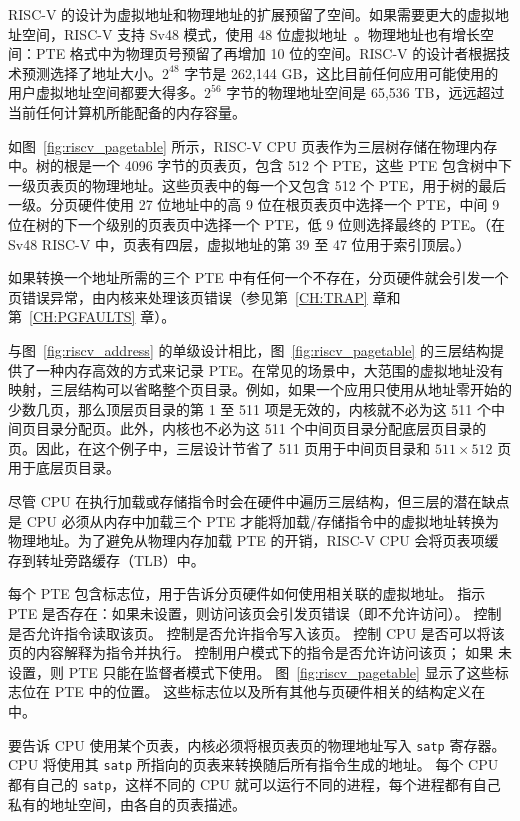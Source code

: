 RISC-V 的设计为虚拟地址和物理地址的扩展预留了空间。如果需要更大的虚拟地址空间，RISC-V 支持 Sv48 模式，使用 48 位虚拟地址~\cite{riscv:priv}。物理地址也有增长空间：PTE 格式中为物理页号预留了再增加 10 位的空间。RISC-V 的设计者根据技术预测选择了地址大小。$2^{48}$ 字节是 262,144 GB，这比目前任何应用可能使用的用户虚拟地址空间都要大得多。$2^{56}$ 字节的物理地址空间是 65,536 TB，远远超过当前任何计算机所能配备的内存容量。

如图~\ref{fig:riscv_pagetable} 所示，RISC-V CPU 页表作为三层树存储在物理内存中。树的根是一个 4096 字节的页表页，包含 512 个 PTE，这些 PTE 包含树中下一级页表页的物理地址。这些页表中的每一个又包含 512 个 PTE，用于树的最后一级。分页硬件使用 27 位地址中的高 9 位在根页表页中选择一个 PTE，中间 9 位在树的下一个级别的页表页中选择一个 PTE，低 9 位则选择最终的 PTE。（在 Sv48 RISC-V 中，页表有四层，虚拟地址的第 39 至 47 位用于索引顶层。）

如果转换一个地址所需的三个 PTE 中有任何一个不存在，分页硬件就会引发一个页错误异常，由内核来处理该页错误（参见第~\ref{CH:TRAP} 章和第~\ref{CH:PGFAULTS} 章）。

与图~\ref{fig:riscv_address} 的单级设计相比，图~\ref{fig:riscv_pagetable} 的三层结构提供了一种内存高效的方式来记录 PTE。在常见的场景中，大范围的虚拟地址没有映射，三层结构可以省略整个页目录。例如，如果一个应用只使用从地址零开始的少数几页，那么顶层页目录的第 1 至 511 项是无效的，内核就不必为这 511 个中间页目录分配页。此外，内核也不必为这 511 个中间页目录分配底层页目录的页。因此，在这个例子中，三层设计节省了 511 页用于中间页目录和 $511\times512$ 页用于底层页目录。

尽管 CPU 在执行加载或存储指令时会在硬件中遍历三层结构，但三层的潜在缺点是 CPU 必须从内存中加载三个 PTE 才能将加载/存储指令中的虚拟地址转换为物理地址。为了避免从物理内存加载 PTE 的开销，RISC-V CPU 会将页表项缓存到转址旁路缓存（TLB）中。

每个 PTE 包含标志位，用于告诉分页硬件如何使用相关联的虚拟地址。
指示 PTE 是否存在：如果未设置，则访问该页会引发页错误（即不允许访问）。
控制是否允许指令读取该页。
控制是否允许指令写入该页。
控制 CPU 是否可以将该页的内容解释为指令并执行。
控制用户模式下的指令是否允许访问该页；
如果  未设置，则 PTE 只能在监督者模式下使用。
图~\ref{fig:riscv_pagetable} 显示了这些标志位在 PTE 中的位置。
这些标志位以及所有其他与页硬件相关的结构定义在
 中。

要告诉 CPU 使用某个页表，内核必须将根页表页的物理地址写入
\texttt{satp} 寄存器。
CPU 将使用其 \texttt{satp} 所指向的页表来转换随后所有指令生成的地址。
每个 CPU 都有自己的 \texttt{satp}，这样不同的 CPU 就可以运行不同的进程，每个进程都有自己私有的地址空间，由各自的页表描述。

